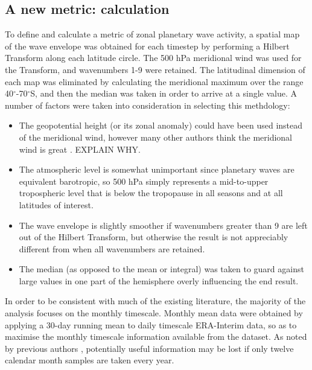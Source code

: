 \subsection{A new metric: calculation}

To define and calculate a metric of zonal planetary wave activity, a spatial map of the wave envelope was obtained for each timestep by performing a Hilbert Transform along each latitude circle. The 500 hPa meridional wind was used for the Transform, and wavenumbers 1-9 were retained. The latitudinal dimension of each map was eliminated by calculating the meridional maximum over the range 40$^{\circ}$-70$^{\circ}$S, and then the median was taken in order to arrive at a single value. A number of factors were taken into consideration in selecting this methdology:
\begin{itemize}
\item The geopotential height (or its zonal anomaly) could have been used instead of the meridional wind, however many other authors think the meridional wind is great \citep[e.g.]{Hope2014}. EXPLAIN WHY.
\item The atmospheric level is somewhat unimportant since planetary waves are equivalent barotropic, so 500 hPa simply represents a mid-to-upper tropospheric level that is below the tropopause in all seasons and at all latitudes of interest.
\item The wave envelope is slightly smoother if wavenumbers greater than 9 are left out of the Hilbert Transform, but otherwise the result is not appreciably different from when all wavenumbers are retained.  
\item The median (as opposed to the mean or integral) was taken to guard against large values in one part of the hemisphere overly influencing the end result.
\end{itemize}

In order to be consistent with much of the existing literature, the majority of the analysis focuses on the monthly timescale. Monthly mean data were obtained by applying a 30-day running mean to daily timescale ERA-Interim data, so as to maximise the monthly timescale information available from the dataset. As noted by previous authors \citep[e.g.][]{Kidson1988}, potentially useful information may be lost if only twelve calendar month samples are taken every year.    